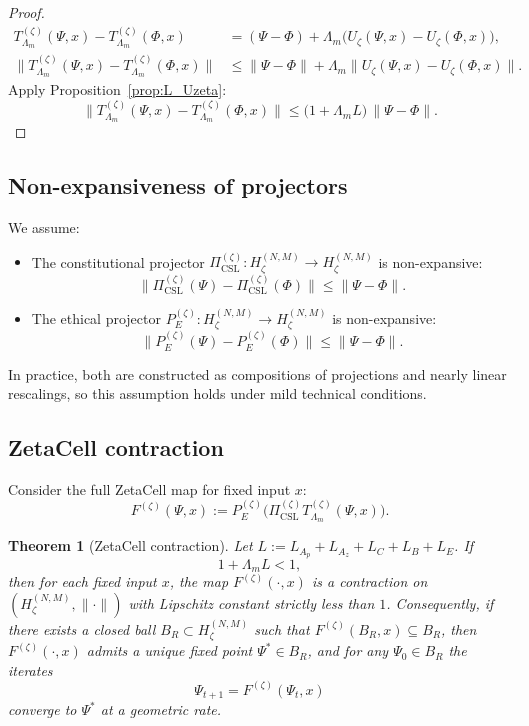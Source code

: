 \documentclass[11pt]{article}
\theoremstyle{definition}
\theoremstyle{plain}
\newtheorem{theorem}{Theorem}
\begin{document}
\begin{proof}
\begin{align*}
  T_{\Lambda_m}^{(\zeta)}(\Psi,x) - T_{\Lambda_m}^{(\zeta)}(\Phi,x)
  &= (\Psi-\Phi) + \Lambda_m\bigl(U_\zeta(\Psi,x)-U_\zeta(\Phi,x)\bigr),\\
  \|T_{\Lambda_m}^{(\zeta)}(\Psi,x) - T_{\Lambda_m}^{(\zeta)}(\Phi,x)\|
  &\le \|\Psi-\Phi\| + \Lambda_m \|U_\zeta(\Psi,x)-U_\zeta(\Phi,x)\|.
\end{align*}
Apply Proposition~\ref{prop:L_Uzeta}:
\[
  \|T_{\Lambda_m}^{(\zeta)}(\Psi,x) - T_{\Lambda_m}^{(\zeta)}(\Phi,x)\|
  \le
  \bigl(1 + \Lambda_m L\bigr)\,\|\Psi-\Phi\|.
\]
\end{proof}

\subsection{Non-expansiveness of projectors}

We assume:

\begin{itemize}[leftmargin=*]
  \item The constitutional projector $\Pi_{\mathrm{CSL}}^{(\zeta)}:H_\zeta^{(N,M)}\to H_\zeta^{(N,M)}$ is non-expansive:
  \[
    \|\Pi_{\mathrm{CSL}}^{(\zeta)}(\Psi) - \Pi_{\mathrm{CSL}}^{(\zeta)}(\Phi)\|
    \le \|\Psi-\Phi\|.
  \]

  \item The ethical projector $P_E^{(\zeta)}:H_\zeta^{(N,M)}\to H_\zeta^{(N,M)}$ is non-expansive:
  \[
    \|P_E^{(\zeta)}(\Psi) - P_E^{(\zeta)}(\Phi)\|
    \le \|\Psi-\Phi\|.
  \]
\end{itemize}

In practice, both are constructed as compositions of projections and nearly linear rescalings, so this assumption holds under mild technical conditions.

\subsection{ZetaCell contraction}

Consider the full ZetaCell map for fixed input $x$:
\[
  F^{(\zeta)}(\Psi,x)
  := P_E^{(\zeta)}\bigl(\Pi_{\mathrm{CSL}}^{(\zeta)} T_{\Lambda_m}^{(\zeta)}(\Psi,x)\bigr).
\]

\begin{theorem}[ZetaCell contraction]\label{thm:zeta_contraction}
Let $L := L_{A_p}+L_{A_z}+L_C+L_B+L_E$.
If
\[
  1 + \Lambda_m L < 1,
\]
then for each fixed input $x$, the map $F^{(\zeta)}(\cdot,x)$ is a contraction on $(H_\zeta^{(N,M)},\|\cdot\|)$ with Lipschitz constant strictly less than $1$.
Consequently, if there exists a closed ball $B_R\subset H_\zeta^{(N,M)}$ such that $F^{(\zeta)}(B_R,x)\subseteq B_R$, then $F^{(\zeta)}(\cdot,x)$ admits a unique fixed point $\Psi^\ast\in B_R$, and for any $\Psi_0\in B_R$ the iterates
\[
  \Psi_{t+1} = F^{(\zeta)}(\Psi_t,x)
\]
converge to $\Psi^\ast$ at a geometric rate.
\end{theorem}
\end{document}
